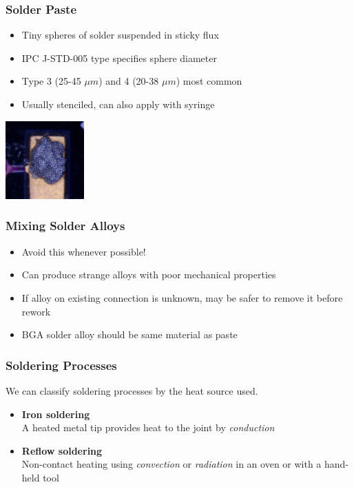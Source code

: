 \documentclass{beamer}
\begin{document}
\begin{frame}
\frametitle{Solder Paste}
\begin{itemize}
\item Tiny spheres of solder suspended in sticky flux
\item IPC J-STD-005 type specifies sphere diameter
\item Type 3 (25-45 $\mu m$) and 4 (20-38 $\mu m$) most common
\item Usually stenciled, can also apply with syringe
\end{itemize}
\begin{center}
\includegraphics[height=3cm,keepaspectratio]{solder-paste.jpg}
\end{center}
\end{frame}

\begin{frame}
\frametitle{Mixing Solder Alloys}
\begin{itemize}
\item Avoid this whenever possible!
\item Can produce strange alloys with poor mechanical properties
\item If alloy on existing connection is unknown, may be safer to remove it before rework
\item BGA solder alloy should be same material as paste
\end{itemize}
\end{frame}

\begin{frame}
\frametitle{Soldering Processes}
We can classify soldering processes by the heat source used.
\begin{itemize}
\item \textbf{Iron soldering} \\
A heated metal tip provides heat to the joint by \emph{conduction}
\item \textbf{Reflow soldering} \\
Non-contact heating using \emph{convection} or \emph{radiation} in an oven or with a hand-held tool
\end{itemize}
\end{frame}
\end{document}
